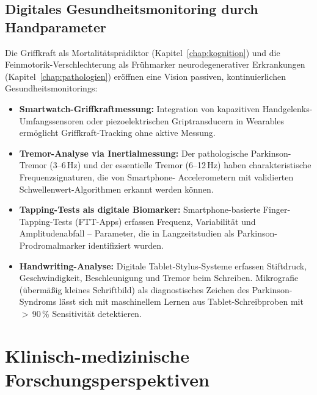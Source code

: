 ﻿\documentclass[12pt,a4paper]{report}
\theoremstyle{plain}
\theoremstyle{definition}
\theoremstyle{remark}
\begin{document}
\subsection{Digitales Gesundheitsmonitoring durch Handparameter}

Die Griffkraft als Mortalitätsprädiktor (Kapitel~\ref{chap:kognition})
und die Feinmotorik-Verschlechterung als Frühmarker neurodegenerativer
Erkrankungen (Kapitel~\ref{chap:pathologien}) eröffnen eine Vision
passiven, kontinuierlichen Gesundheitsmonitorings:

\begin{itemize}
\item \textbf{Smartwatch-Griffkraftmessung:} Integration von
  kapazitiven Handgelenks-Umfangssensoren oder piezoelektrischen
  Griptransducern in Wearables ermöglicht Griffkraft-Tracking ohne
  aktive Messung.
\item \textbf{Tremor-Analyse via Inertialmessung:} Der pathologische
  Parkinson-Tremor (3--6\,Hz) und der essentielle Tremor (6--12\,Hz)
  haben charakteristische Frequenzsignaturen, die von Smartphone-
  Accelerometern mit validierten Schwellenwert-Algorithmen erkannt
  werden können.
\item \textbf{Tapping-Tests als digitale Biomarker:} Smartphone-basierte
  Finger-Tapping-Tests (FTT-Apps) erfassen Frequenz, Variabilität
  und Amplitudenabfall -- Parameter, die in Langzeitstudien als
  Parkinson-Prodromalmarker identifiziert wurden.
\item \textbf{Handwriting-Analyse:} Digitale Tablet-Stylus-Systeme
  erfassen Stiftdruck, Geschwindigkeit, Beschleunigung und Tremor
  beim Schreiben. Mikrografie (übermäßig kleines Schriftbild) als
  diagnostisches Zeichen des Parkinson-Syndroms lässt sich mit
  maschinellem Lernen aus Tablet-Schreibproben mit $>$\,90\,\%
  Sensitivität detektieren.
\end{itemize}

\section{Klinisch-medizinische Forschungsperspektiven}
\end{document}
